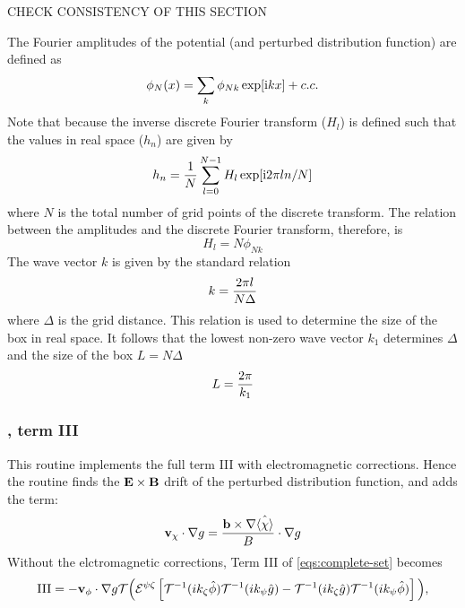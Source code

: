 CHECK CONSISTENCY OF THIS SECTION

The Fourier amplitudes of the potential (and perturbed distribution function) are defined as 
\begin{equation} 
\phi_N(x) = \sum_k \phi_{Nk} \exp [ {\rm i} k x ] + c.c.  
\end{equation} 
Note that because the inverse discrete Fourier transform ($H_l$) is defined such that 
the values in real space ($h_n$) are given by  
\begin{equation} 
h_n = {1\over N} \sum_{l=0}^{N-1} H_l \exp [ {\rm i} 2\pi l n / N ] 
\end{equation} 
where $N$ is the total number of grid points of the discrete transform. The relation between the 
amplitudes and the discrete Fourier transform, therefore, is 
\begin{equation} 
H_l = N\phi_{Nk}
\end{equation} 
The wave vector $k$ is given by the standard relation  
\begin{equation} 
k = {2 \pi l \over N \Delta} 
\end{equation} 
where $\Delta$ is the grid distance. This relation is used to determine the size of the box 
in real space. It follows that the lowest non-zero wave vector $k_1$ determines $\Delta$ and
the size of the box $L = N\Delta$ 
\begin{equation} 
L = {2\pi \over k_1} 
\end{equation} 

\subsubsection{, term III} 
This routine implements the full term III with electromagnetic corrections.  Hence the routine finds the ${\bf E} \times {\bf B}$ drift of the perturbed distribution function, and adds the term:
\begin{equation} 
\label{Edrift}
{\bf v}_\chi \cdot \nabla g = {{\bf b} \times \nabla \hat{\langle \chi \rangle} \over B} \cdot \nabla g
\end{equation}
Without the elctromagnetic corrections, Term III of \ref{eqs:complete-set} becomes
\begin{equation}
{\rm III} = - {\bf v}_\phi \cdot \nabla g  \mathcal{T}\Big({\cal E}^{\psi \zeta}\left[\mathcal{T}^{-1}(ik_{\zeta} \hat{ \phi }) \mathcal{T}^{-1}(ik_{\psi} \hat g) -
\mathcal{T}^{-1}(ik_{\zeta} \hat g) \mathcal{T}^{-1}(ik_{\psi} \hat{ \phi })\right]\Big),
\end{equation}

